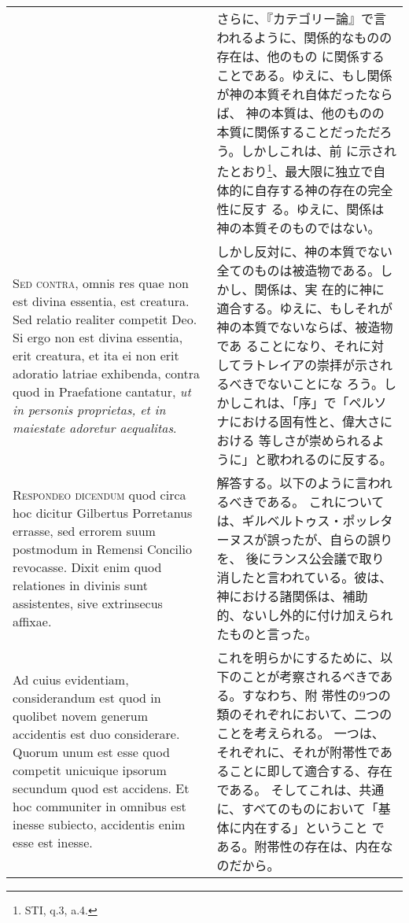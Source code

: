 \documentclass[10pt]{jsarticle} %
\begin{document}
\begin{longtable}{p{21em}p{21em}}
&


さらに、『カテゴリー論』で言われるように、関係的なものの存在は、他のもの
 に関係することである。ゆえに、もし関係が神の本質それ自体だったならば、
 神の本質は、他のものの本質に関係することだっただろう。しかしこれは、前
 に示されたとおり\footnote{STI, q.3, a.4.}、最大限に独立で自体的に自存する神の存在の完全性に反す
 る。ゆえに、関係は神の本質そのものではない。


\\



{\scshape Sed contra}, omnis res quae non est divina essentia, est creatura. Sed
relatio realiter competit Deo. Si ergo non est divina essentia, erit
creatura, et ita ei non erit adoratio latriae exhibenda, contra quod in
Praefatione cantatur, {\itshape ut in personis proprietas, et in maiestate
adoretur aequalitas}.


&

しかし反対に、神の本質でない全てのものは被造物である。しかし、関係は、実
 在的に神に適合する。ゆえに、もしそれが神の本質でないならば、被造物であ
 ることになり、それに対してラトレイアの崇拝が示されるべきでないことにな
 ろう。しかしこれは、「序」で「ペルソナにおける固有性と、偉大さにおける
 等しさが崇められるように」と歌われるのに反する。


\\



{\scshape Respondeo dicendum} quod circa hoc dicitur Gilbertus Porretanus errasse,
sed errorem suum postmodum in Remensi Concilio revocasse. Dixit enim
quod relationes in divinis sunt assistentes, sive extrinsecus
affixae. 



&

解答する。以下のように言われるべきである。
これについては、ギルベルトゥス・ポッレターヌスが誤ったが、自らの誤りを、
後にランス公会議で取り消したと言われている。彼は、神における諸関係は、補助
 的、ないし外的に付け加えられたものと言った。


\\


Ad cuius evidentiam, considerandum est quod in quolibet novem
generum accidentis est duo considerare. Quorum unum est esse quod
competit unicuique ipsorum secundum quod est accidens. Et hoc communiter
in omnibus est inesse subiecto, accidentis enim esse est inesse. 



&

これを明らかにするために、以下のことが考察されるべきである。すなわち、附
 帯性の9つの類のそれぞれにおいて、二つのことを考えられる。
一つは、それぞれに、それが附帯性であることに即して適合する、存在である。
 そしてこれは、共通に、すべてのものにおいて「基体に内在する」ということ
 である。附帯性の存在は、内在なのだから。



\end{longtable}
\end{document}
